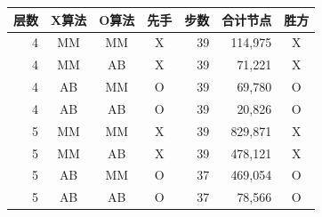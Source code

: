 \begin{tabular}{rcccrrc}
\toprule
层数 & X算法 & O算法 & 先手 & 步数 & 合计节点 & 胜方 \\
\midrule
4 & MM & MM & X & 39 & 114,975 & X \\
4 & MM & AB & X & 39 & 71,221 & X \\
4 & AB & MM & O & 39 & 69,780 & O \\
4 & AB & AB & O & 39 & 20,826 & O \\
5 & MM & MM & X & 39 & 829,871 & X \\
5 & MM & AB & X & 39 & 478,121 & X \\
5 & AB & MM & O & 37 & 469,054 & O \\
5 & AB & AB & O & 37 & 78,566 & O \\
\bottomrule
\end{tabular}
